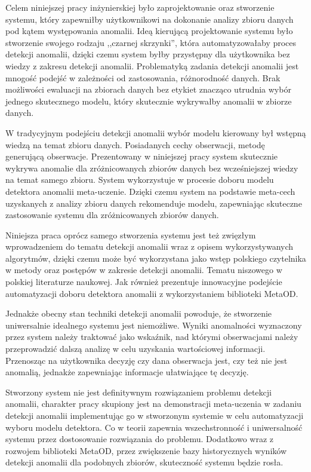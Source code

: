 Celem niniejszej pracy inżynierskiej było zaprojektowanie oraz stworzenie systemu, który zapewniłby użytkownikowi na dokonanie analizy zbioru danych pod kątem występowania anomalii. Ideą kierującą projektowanie systemu było stworzenie swojego rodzaju ,,czarnej skrzynki'', która automatyzowałaby proces detekcji anomalii, dzięki czemu system byłby przystępny dla użytkownika bez wiedzy z zakresu detekcji anomalii. Problematyką zadania detekcji anomalii jest mnogość podejść w zależności od zastosowania, różnorodność danych. Brak możliwości ewaluacji na zbiorach danych bez etykiet znacząco utrudnia wybór jednego skutecznego modelu, który skutecznie wykrywałby anomalii w zbiorze danych.


W tradycyjnym podejściu detekcji anomalii wybór modelu kierowany był wstępną wiedzą na temat zbioru danych. Posiadanych cechy obserwacji, metodę generującą obserwacje. Prezentowany w niniejszej pracy system skutecznie wykrywa anomalie dla zróżnicowanych zbiorów danych bez wcześniejszej wiedzy na temat samego zbioru. System wykorzystuje w procesie doboru modelu detektora anomalii meta-uczenie. Dzięki czemu system na podstawie meta-cech uzyskanych z analizy zbioru danych rekomenduje modelu, zapewniając skuteczne zastosowanie systemu dla zróżnicowanych zbiorów danych.

Niniejsza praca oprócz samego stworzenia systemu jest też zwięzłym wprowadzeniem do tematu detekcji anomalii wraz z opisem wykorzystywanych algorytmów, dzięki czemu może być wykorzystana jako wstęp polskiego czytelnika w metody oraz postępów w zakresie detekcji anomalii. Tematu niszowego w polskiej literaturze naukowej. Jak również prezentuje innowacyjne podejście automatyzacji doboru detektora anomalii z wykorzystaniem biblioteki MetaOD.

Jednakże obecny stan techniki detekcji anomalii powoduje, że stworzenie uniwersalnie idealnego systemu jest niemożliwe. Wyniki anomalności wyznaczony przez system należy traktować jako wskaźnik, nad którymi obserwacjami należy przeprowadzić dalszą analizę w celu uzyskania wartościowej informacji. Przenosząc na użytkownika decyzję czy dana obserwacja jest, czy też nie jest anomalią, jednakże zapewniając informacje ułatwiające tę decyzję.

Stworzony system nie jest definitywnym rozwiązaniem problemu detekcji anomalii, charakter pracy skupiony jest na demonstracji meta-uczenia w zadaniu detekcji anomalii implementując go w stworzonym systemie w celu automatyzacji wyboru modelu detektora. Co w teorii zapewnia wszechstronność i uniwersalność systemu przez dostosowanie rozwiązania do problemu. Dodatkowo wraz z rozwojem biblioteki MetaOD, przez zwiększenie bazy historycznych wyników detekcji anomalii dla podobnych zbiorów, skuteczność systemu będzie rosła. 

